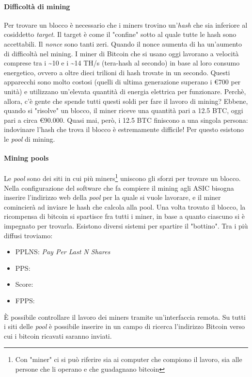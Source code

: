 \documentclass {article}
\begin{document}
\paragraph {Difficoltà di mining}

Per trovare un blocco è necessario che i miners trovino un'\textit{hash} che sia inferiore al cosiddetto \textit{target}. Il target è come il "confine" sotto al quale tutte le hash sono accettabili.
Il \textit{nonce} sono tanti zeri. %
Quando il nonce aumenta di ha un'aumento di difficoltà nel mining. 
I miner di Bitcoin che si usano oggi lavorano a velocità comprese tra i \textasciitilde 10 e i \textasciitilde 14 TH/s (tera-hash al secondo) in base al loro consumo energetico, ovvero a oltre dieci trilioni di hash trovate in un secondo.
Questi apparecchi sono molto costosi (quelli di ultima generazione superano i \euro{700} per unità) e utilizzano un'elevata quantità di energia elettrica per funzionare.
Perchè, allora, c'è gente che spende tutti questi soldi per fare il lavoro di mining?
Ebbene, quando si "risolve" un blocco, il miner riceve una quantità pari a 12.5 BTC, oggi pari a circa \euro{90.000}.
Quasi mai, però, i 12.5 BTC finiscono a una singola persona: indovinare l'hash che trova il blocco è estremamente difficile!
Per questo esistono le \textit{pool} di mining.


\paragraph {Mining pools}


Le \textit{pool} sono dei siti in cui più miners\footnote{Con "miner" ci si può riferire sia ai computer che compiono il lavoro, sia alle persone che li operano e che guadagnano bitcoin} uniscono gli sforzi per trovare un blocco.
Nella configurazione del software che fa compiere il mining agli ASIC bisogna inserire l'indirizzo web della \textit{pool} per la quale si vuole lavorare, e il miner comincierà ad inviare le hash che calcola alla pool.
Una volta trovato il blocco, la ricompensa di bitcoin si spartisce fra tutti i miner, in base a quanto ciascuno si è impegnato per trovarla.
Esistono diversi sistemi per spartire il "bottino". Tra i più diffusi troviamo:

\begin{itemize}
\item PPLNS: \textit{Pay Per Last N Shares}
\item PPS:
\item Score:
\item FPPS:
\end{itemize}
%
È possibile controllare il lavoro dei miners tramite un'interfaccia remota. Su tutti i siti delle \textit{pool} è possibile inserire in un campo di ricerca l'indirizzo Bitcoin verso cui i bitcoin ricavati saranno inviati.
\end{document}
